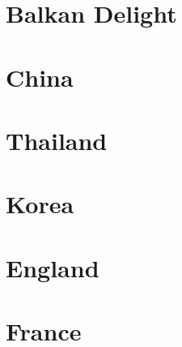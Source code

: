 \documentclass[twosides, 11pt]{book}
\newcommand\blankpage{%
    \null
    \thispagestyle{empty}%
    \addtocounter{page}{-1}%
    \newpage}
\begin{document}
\blankpage
\maketitle
\tableofcontents

\chapter{Balkan Delight}

%
%
%
%
%
%


%


\chapter{China}
%
%
%
%
%
%
%

%
%

\chapter{Thailand}
%

\chapter{Korea}
%
%
%
%


\chapter{England}
%
%
%
%
%
%
%
%
%
%
%
%
%

\chapter{France}
%
%
\end{document}
